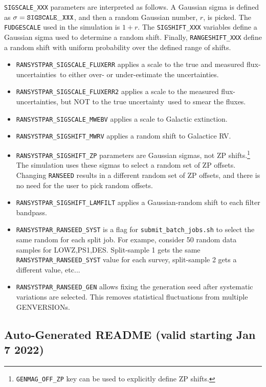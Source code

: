 \documentclass[12pt]{article}
\newcommand{\unc}{uncertainty}
\newcommand{\uncs}{uncertainties}
\begin{document}
{\tt SIGSCALE\_XXX} parameters are interpreted as follows.
A Gaussian sigma is defined as $\sigma={\tt SIGSCALE\_XXX}$,
and then a random Gaussian number, $r$, is picked. 
The {\tt FUDGESCALE} used in the simulation is $1+r$.
The {\tt SIGSHIFT\_XXX} variables define a Gaussian sigma used
to determine a random shift. Finally, {\tt RANGESHIFT\_XXX}
define a random shift with uniform probability over the defined range
of shifts.
%
\begin{itemize}
  \item {\tt RANSYSTPAR\_SIGSCALE\_FLUXERR} applies a scale to the 
        true and measured
        flux-\uncs\ to either over- or under-estimate the \uncs.
%
  \item {\tt RANSYSTPAR\_SIGSCALE\_FLUXERR2} applies a scale to the measured
        flux-\uncs, but NOT to the true \unc\ used to smear the fluxes. 
%
 \item {\tt RANSYSTPAR\_SIGSCALE\_MWEBV} applies a scale to Galactic extinction.
%
 \item {\tt RANSYSTPAR\_SIGSHIFT\_MWRV} applies a random shift to Galactice RV.
  \item {\tt RANSYSTPAR\_SIGSHIFT\_ZP} parameters are Gaussian sigmas,
        not ZP shifts.\footnote{{\tt GENMAG\_OFF\_ZP} key can be used 
            to explicitly define ZP shifts.}
        The simulation uses these sigmas to select a random set of ZP offsets.
        Changing {\tt RANSEED} results in a different random set of ZP offsets,
        and there is no need for the user to pick random offsets.
%
  \item {\tt RANSYSTPAR\_SIGSHIFT\_LAMFILT} applies a Gaussian-random shift
          to each filter bandpass.
%
  \item {\tt RANSYSTPAR\_RANSEED\_SYST} is a flag for 
      {\tt submit\_batch\_jobs.sh} to select the same random for each
      split job. For exampe, consider 50 random data samples for LOWZ,PS1,DES.
      Split-sample 1 gets the same {\tt RANSYSTPAR\_RANSEED\_SYST} value
      for each survey,  split-sample 2 gets a different value, etc...
%
  \item {\tt RANSYSTPAR\_RANSEED\_GEN} allows fixing the generation seed
        after systematic variations are selected. This removes statistical
        fluctuations from multiple GENVERSIONs.
\end{itemize}


   \subsection{Auto-Generated README (valid starting Jan 7 2022) }
   \label{ssec:SIM_README}
\end{document}
